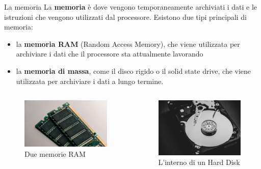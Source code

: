 \begin{frame}
	
	\begin{block}{La memoria}
		La \textbf{memoria} è dove vengono temporaneamente archiviati i dati e le istruzioni che vengono utilizzati dal processore. Esistono due tipi principali di memoria: 
		\begin{itemize}
			\item la \textbf{memoria RAM} (Random Access Memory), che viene utilizzata per archiviare i dati che il processore sta attualmente lavorando
			\item la \textbf{memoria di massa}, come il disco rigido o il solid state drive, che viene utilizzata per archiviare i dati a lungo termine.
		\end{itemize}
	\end{block}
	
	\begin{columns}			
		\begin{figure}[!htbp]
			\centering
			\includegraphics[width=0.82\linewidth]{images/2_le_architetture/memory_ram.jpg}
			\caption{Due memorie RAM}
			\label{fig:architectures_memory_ram}
		\end{figure}
					
		\begin{figure}[!htbp] 
			\centering
			\includegraphics[width=0.7\linewidth]{images/2_le_architetture/memory_hdd.jpg}
			\caption{L'interno di un Hard Disk}
			\label{fig:architectures_memory_hdd}
		\end{figure}
		
	\end{columns}
	
\end{frame}


